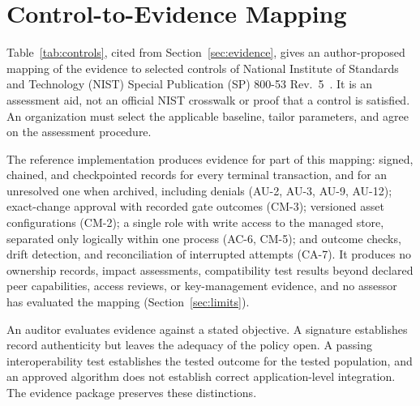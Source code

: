 \section{Control-to-Evidence Mapping}
\label{s:controls}
Table~\ref{tab:controls}, cited from Section~\ref{sec:evidence}, gives an author-proposed mapping of the evidence to selected controls of National Institute of Standards and Technology (NIST) Special Publication (SP) 800-53 Rev.~5~\cite{sp80053}. It is an assessment aid, not an official NIST crosswalk or proof that a control is satisfied. An organization must select the applicable baseline, tailor parameters, and agree on the assessment procedure.

The reference implementation produces evidence for part of this mapping: signed, chained, and checkpointed records for every terminal transaction, and for an unresolved one when archived, including denials (AU-2, AU-3, AU-9, AU-12); exact-change approval with recorded gate outcomes (CM-3); versioned asset configurations (CM-2); a single role with write access to the managed store, separated only logically within one process (AC-6, CM-5); and outcome checks, drift detection, and reconciliation of interrupted attempts (CA-7). It produces no ownership records, impact assessments, compatibility test results beyond declared peer capabilities, access reviews, or key-management evidence, and no assessor has evaluated the mapping (Section~\ref{sec:limits}).

An auditor evaluates evidence against a stated objective. A signature establishes record authenticity but leaves the adequacy of the policy open. A passing interoperability test establishes the tested outcome for the tested population, and an approved algorithm does not establish correct application-level integration. The evidence package preserves these distinctions.

